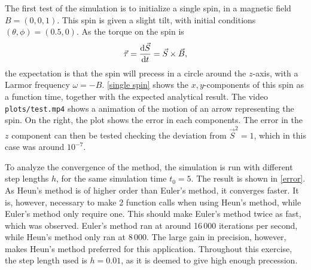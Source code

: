 \documentclass{article}
\begin{document}
    The first test of the simulation is to initialize a single spin, in a magnetic field $B = (0, 0, 1)$.
    This spin is given a slight tilt, with initial conditions $(\theta, \phi) = (0.5, 0)$.
    As the torque on the spin is 
    \begin{equation*}
        \vec \tau = \dv{\vec S}{t} = \vec{S} \times \vec{B},
    \end{equation*}
    the expectation is that the spin will precess in a circle around the $z$-axis, with a Larmor frequency $\omega = -B$.
    \autoref{single spin} shows the $x,y$-components of this spin as a function time, together with the expected analytical result.
    The video \verb|plots/test.mp4| shows a animation of the motion of an arrow representing the spin. On the right, the plot shows the error in each components.
    The error in the $z$ component can then be tested checking the deviation from $\vec S^2=1$, which in this case was around $10^{-7}$.

    To analyze the convergence of the method, the simulation is run with different step lengths $h$, for the same simulation time $t_0 = 5$.
    The result is shown in \autoref{error}.
    As Heun's method is of higher order than Euler's method, it converges faster.
    It is, however, necessary to make 2 function calls when using Heun's method, while Euler's method only require one.
    This should make Euler's method twice as fast, which was observed.
    Euler's method ran at around 16\,000 iterations per second, while Heun's method only ran at 8\,000.
    The large gain in precision, however, makes Heun's method preferred for this application. 
    Throughout this exercise, the step length used is $h=0.01$, as it is deemed to give high enough precession.
\end{document}
